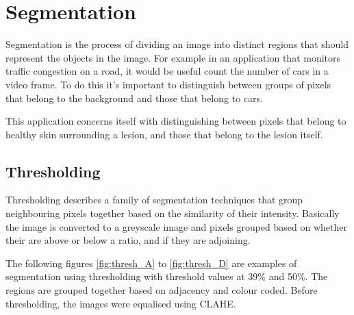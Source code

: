 \section{Segmentation}

Segmentation is the process of dividing an image into distinct regions that should represent the objects in the image. For example in an application that monitors traffic congestion on a road, it would be useful count the number of cars in a video frame. To do this it’s important to distinguish between groups of pixels that belong to the background and those that belong to cars.

This application concerns itself with distinguishing between pixels that belong to healthy skin surrounding a lesion, and those that belong to the lesion itself.

\subsection{Thresholding}

Thresholding describes a family of segmentation techniques that group neighbouring pixels together based on the similarity of their intensity. Basically the image is converted to a greyscale image and pixels grouped based on whether their are above or below a ratio, and if they are adjoining.

The following figures \ref{fig:thresh_A} to \ref{fig:thresh_D} are examples of segmentation using thresholding with threshold values at 39\% and 50\%. The regions are grouped together based on adjacency and colour coded. Before thresholding, the images were equalised using CLAHE.

